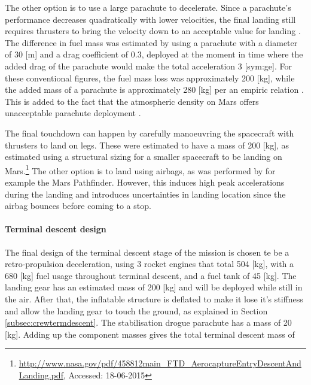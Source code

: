 The other option is to use a large parachute to decelerate. Since a parachute's performance decreases quadratically with lower velocities, the final landing still requires thrusters to bring the velocity down to an acceptable value for landing \cite{Braun2007}. The difference in fuel mass was estimated by using a parachute with a diameter of 30 [m] and a drag coefficient of 0.3, deployed at the moment in time where the added drag of the parachute would make the total acceleration 3 [\gls{sym:ge}]. For these conventional figures, the fuel mass loss was approximately 200 [kg], while the added mass of a parachute is approximately 280 [kg] per an empiric relation \cite{Anderson1969}. This is added to the fact that the atmospheric density on Mars offers unacceptable parachute deployment \cite{Korzun2009}.

The final touchdown can happen by carefully manoeuvring the spacecraft with thrusters to land on legs. These were estimated to have a mass of 200 [kg], as estimated using a structural sizing for a smaller spacecraft to be landing on Mars.\footnote{\url{http://www.nasa.gov/pdf/458812main_FTD_AerocaptureEntryDescentAndLanding.pdf}, Accessed: 18-06-2015} The other option is to land using airbags, as was performed by for example the Mars Pathfinder. However, this induces high peak accelerations during the landing and introduces uncertainties in landing location since the airbag bounces before coming to a stop.

\paragraph{Terminal descent design}
The final design of the terminal descent stage of the mission is chosen te be a retro-propulsion deceleration, using 3 rocket engines that total 504 [kg], with a 680 [kg] fuel usage throughout terminal descent, and a fuel tank of 45 [kg]. The landing gear has an estimated mass of 200 [kg] and will be deployed while still in the air. After that, the inflatable structure is deflated to make it lose it's stiffness and allow the landing gear to touch the ground, as explained in Section \ref{subsec:crewtermdescent}. The stabilisation drogue parachute has a mass of 20 [kg]. Adding up the component masses gives the total terminal descent mass of 